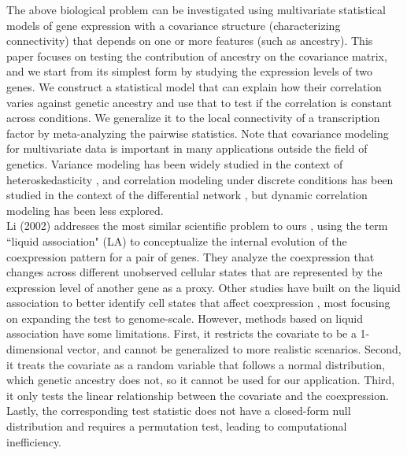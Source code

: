 \documentclass[aap, preprint]{imsart}
\numberwithin{equation}{section}
\theoremstyle{plain}
\begin{document}
The above biological problem can be investigated using multivariate statistical models of gene expression with a covariance structure (characterizing connectivity) that depends on one or more features (such as ancestry). This paper focuses on testing the contribution of ancestry on the covariance matrix, and we start from its simplest form by studying the expression levels of two genes. We construct a statistical model that can explain how their correlation varies against genetic ancestry and use that to test if the correlation is constant across conditions. We generalize it to the local connectivity of a transcription factor by meta-analyzing the pairwise statistics. Note that covariance modeling for multivariate data is important in many applications outside the field of genetics. Variance modeling has been widely studied in the context of heteroskedasticity \cite{breusch1979simple, glejser1969new, white1980heteroskedasticity}, and correlation modeling under discrete conditions has been studied in the context of the differential network \cite{ideker2012differential}, but dynamic correlation modeling has been less explored. \\

Li (2002) addresses the most similar scientific problem to ours \cite{li2002genome, li2004system}, using the term ``liquid association" (LA) to conceptualize the internal evolution of the coexpression pattern for a pair of genes. They analyze the coexpression that changes across different unobserved cellular states that are represented by the expression level of another gene as a proxy. Other studies have built on the liquid association to better identify cell states that affect coexpression \cite{yan2017detecting, yu2018new}, most focusing on expanding the test to genome-scale. However, methods based on liquid association have some limitations. First, it restricts the covariate to be a 1-dimensional vector, and cannot be generalized to more realistic scenarios. Second, it treats the covariate as a random variable that follows a normal distribution, which genetic ancestry does not, so it cannot be used for our application. Third, it only tests the linear relationship between the covariate and the coexpression. Lastly, the corresponding test statistic does not have a closed-form null distribution and requires a permutation test, leading to computational inefficiency. \\
\end{document}
